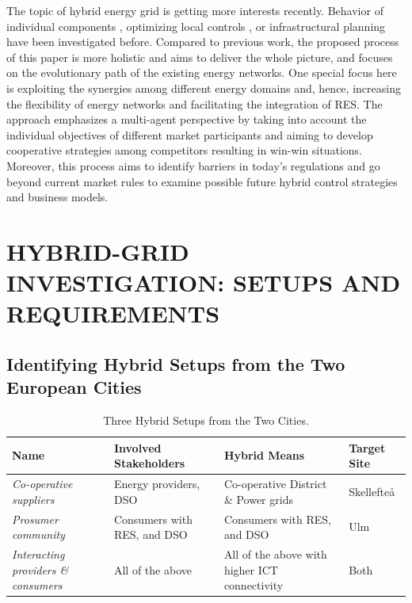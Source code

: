 \documentclass[a4paper,twoside]{article}
\begin{document}
The topic of hybrid energy grid is getting more interests recently. 
Behavior of individual components \cite{keirstead_2012}, optimizing
local controls \cite{etransport}\cite{arnold_2009}, or infrastructural
planning \cite{infraplan} have been investigated before. 
Compared to previous work, the proposed process of this paper is more
holistic and aims to deliver the whole picture, and focuses on the
evolutionary path of the existing energy networks. 
One special focus here is exploiting the synergies among different
energy domains and, hence, increasing the flexibility of energy
networks and facilitating the integration of RES. The approach
emphasizes a multi-agent perspective by taking into account the
individual objectives of different market participants and aiming to
develop cooperative strategies among competitors resulting in win-win 
situations. Moreover, this process aims to identify barriers in
today’s regulations and go beyond current market rules to examine
possible future hybrid control strategies and business models. 

\section{\uppercase{Hybrid-grid Investigation: 
Setups and Requirements}}
\label{sec:req}

\subsection{Identifying Hybrid Setups from the Two European Cities}
\label{sec:req-1}

\begin{table}[t]
  \centering
  \caption{Three Hybrid Setups from the Two Cities.}
  \label{tab:1}
  \begin{tabular}{|p{3cm}|p{4cm}|p{4cm}|p{2cm}|}
    \hline
    Name & Involved Stakeholders & Hybrid Means & Target Site \\ \hline
    {\em Co-operative suppliers} & Energy providers, DSO & Co-operative District \& Power grids & Skellefte\aa \\ \hline 
    {\em Prosumer community} & Consumers with RES, and DSO & Consumers with RES, and DSO & Ulm \\ \hline 
    {\em Interacting providers \& consumers} & All of the above & All of the above with higher ICT connectivity & Both\\ \hline  
  \end{tabular}
\end{table}
\end{document}
